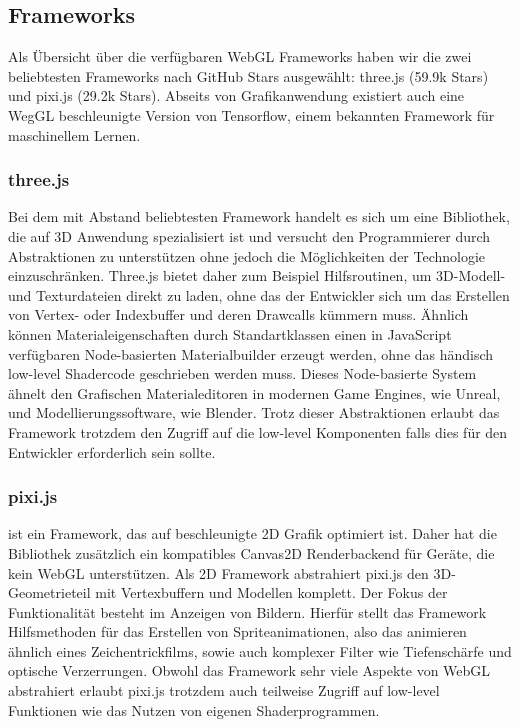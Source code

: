 \subsection{Frameworks}
Als Übersicht über die verfügbaren WebGL Frameworks haben wir die zwei beliebtesten Frameworks nach GitHub Stars ausgewählt: three.js (59.9k Stars) und pixi.js (29.2k Stars). Abseits von Grafikanwendung existiert auch eine WegGL beschleunigte Version von Tensorflow, einem bekannten Framework für maschinellem Lernen.
\subsubsection*{three.js} Bei dem mit Abstand beliebtesten Framework handelt es sich um eine Bibliothek, die auf 3D Anwendung spezialisiert ist und versucht den Programmierer durch Abstraktionen zu unterstützen ohne jedoch die Möglichkeiten der Technologie einzuschränken. Three.js bietet daher zum Beispiel Hilfsroutinen, um 3D-Modell- und Texturdateien direkt zu laden, ohne das der Entwickler sich um das Erstellen von Vertex- oder Indexbuffer und deren Drawcalls kümmern muss. Ähnlich können Materialeigenschaften durch Standartklassen \bzw einen in JavaScript verfügbaren Node-basierten Materialbuilder erzeugt werden, ohne das händisch low-level Shadercode geschrieben werden muss. Dieses Node-basierte System ähnelt den Grafischen Materialeditoren in modernen Game Engines, wie \zb Unreal, und Modellierungssoftware, wie \zb Blender. Trotz dieser Abstraktionen erlaubt das Framework trotzdem den Zugriff auf die low-level Komponenten falls dies für den Entwickler erforderlich sein sollte.
\subsubsection*{pixi.js} ist ein Framework, das auf beschleunigte 2D Grafik optimiert ist. Daher hat die Bibliothek zusätzlich ein kompatibles Canvas2D Renderbackend für Geräte, die kein WebGL unterstützen. Als 2D Framework abstrahiert pixi.js den 3D-Geometrieteil mit Vertexbuffern und Modellen komplett. Der Fokus der Funktionalität besteht im Anzeigen von Bildern. Hierfür stellt das Framework Hilfsmethoden für das Erstellen von Spriteanimationen, also das animieren ähnlich eines Zeichentrickfilms, sowie auch komplexer Filter wie Tiefenschärfe und optische Verzerrungen. Obwohl das Framework sehr viele Aspekte von WebGL abstrahiert erlaubt pixi.js trotzdem auch teilweise Zugriff auf low-level Funktionen wie das Nutzen von eigenen Shaderprogrammen.
